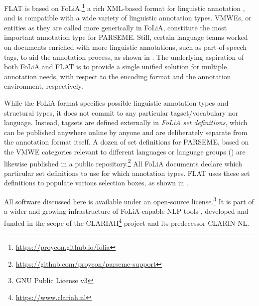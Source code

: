 \documentclass[output=paper,
modfonts,
]{langscibook}
\begin{document}
FLAT is based on FoLiA,\footnote{\scriptsize\url{https://proycon.github.io/folia}} a rich XML-based format for linguistic annotation
\citep{GompelReynaert13}, and is compatible with a wide variety of linguistic annotation types. 
VMWEs, or entities as they are called more generically in FoLiA, constitute the most important
annotation type for PARSEME. Still, certain language teams worked on documents enriched with more linguistic
annotations, such as part-of-speech tags, to aid the annotation process, as shown in . The underlying aspiration of both FoLiA and
FLAT is to provide a single unified solution for multiple annotation needs, with respect to the encoding format and the 
annotation environment, respectively.



While the FoLiA format %
specifies possible linguistic annotation types and structural types, 
it does not commit to any particular tagset/vocabulary nor language. %
Instead, tagsets are
defined externally in \emph{FoLiA set definitions}, which can be published anywhere online by
anyone and are deliberately separate from the annotation format itself. A dozen of set definitions for PARSEME, based on the VMWE categories relevant to different languages or language groups () are likewise published in a public repository.\footnote{\scriptsize{\url{https://github.com/proycon/parseme-support}}} All FoLiA documents declare which particular set definitions to use for which annotation
types. FLAT uses these set definitions to populate various selection boxes,  %
as shown in .


All software discussed here %
is %
available under an open-source license.\footnote{\scriptsize{GNU Public License v3}} It is %
part of a wider and growing infrastructure of FoLiA-capable NLP tools \citep{Gompel_etal:17}, developed and funded in the scope of the %
CLARIAH\footnote{\scriptsize{\url{https://www.clariah.nl}}} project and its predecessor CLARIN-NL.
\end{document}
